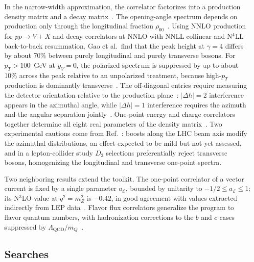 \documentclass[11pt]{article}
\begin{document}
In the narrow-width approximation, the correlator factorizes into a production density matrix and a decay matrix~\cite{Ricci:2022htc,Gao:2026hoj}.
The opening-angle spectrum depends on production only through the longitudinal fraction \(\rho_{00}\)~\cite{Gao:2026hoj}.
Using NNLO production for \(pp \to V+X\) and decay correlators at NNLO with NNLL collinear and N\(^4\)LL back-to-back resummation, Gao et al.\ find that the peak height at \(\gamma = 4\) differs by about 70\% between purely longitudinal and purely transverse bosons.
For \(p_T > 100\)~GeV at \(y_V = 0\), the polarized spectrum is suppressed by up to about 10\% across the peak relative to an unpolarized treatment, because high-\(p_T\) production is dominantly transverse~\cite{Gao:2026hoj}.
The off-diagonal entries require measuring the detector orientation relative to the production plane~\cite{Gao:2026hoj}: \(|\Delta h| = 2\) interference appears in the azimuthal angle, while \(|\Delta h| = 1\) interference requires the azimuth and the angular separation jointly~\cite{Ricci:2022htc}.
One-point energy and charge correlators together determine all eight real parameters of the density matrix~\cite{Gao:2026hoj}.
Two experimental cautions come from Ref.~\cite{ricciEnergyCorrelatorsHadronically2022}: boosts along the LHC beam axis modify the azimuthal distributions, an effect expected to be mild but not yet assessed, and in a lepton-collider study \(D_2\) selections preferentially reject transverse bosons, homogenizing the longitudinal and transverse one-point spectra.

Two neighboring results extend the toolkit.
The one-point correlator of a vector current is fixed by a single parameter \(a_{\mathcal{E}}\), bounded by unitarity to \(-1/2 \leq a_{\mathcal{E}} \leq 1\); its N\(^3\)LO value at \(q^2 = m_Z^2\) is \(-0.42\), in good agreement with values extracted indirectly from LEP data~\cite{riembauFlowExtremalOnepoint2026}.
Flavor flux correlators generalize the program to flavor quantum numbers, with hadronization corrections to the \(b\) and \(c\) cases suppressed by \(\Lambda_{\mathrm{QCD}}/m_Q\)~\cite{leeFlavorFluxCorrelators2026}.

\subsection{Searches}
\end{document}
